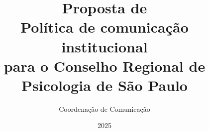 \documentclass[twoside,openright,a4paper, 14pt, brazil]{abntex2}
\title{Proposta de\\ \textbf{Política de comunicação institucional}\\ para o Conselho Regional de Psicologia de São Paulo}
\author{Coordenação de Comunicação}
\date{2025}
\begin{document}
\pagestyle{pretextu}
\maketitle
\thispagestyle{pretextu}
\pretextual


%
\cleartorecto
\tableofcontents*
\clearpage
%
\textual
\pagestyle{plain}
%




%
\postextual
%
\begin{apendicesenv}


\end{apendicesenv}

%
\end{document}
